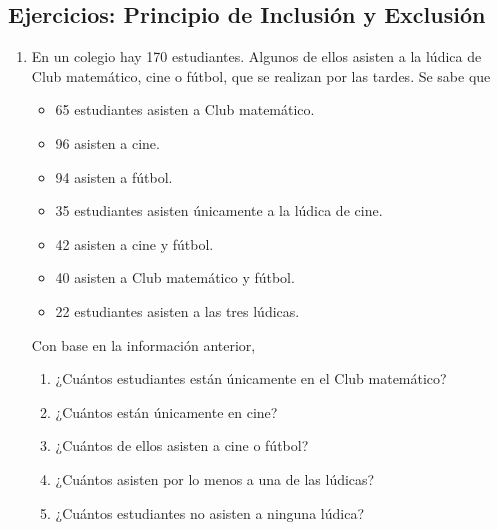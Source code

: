 \newpage
\begin{center}
	\vspace{-1cm}
	\section{ Ejercicios: Principio de Inclusión y Exclusión}
\end{center}	
\begin{enumerate}
	\item En un colegio hay 170 estudiantes. Algunos de ellos asisten a la lúdica de Club matemático,  cine o fútbol, que se realizan por las tardes. Se sabe que
	\begin{itemize}
		\item 65 estudiantes asisten a Club matemático.
		\item 96 asisten a cine.
		\item 94 asisten a fútbol.
		\item 35 estudiantes asisten únicamente a la lúdica de cine.
		\item 42 asisten a cine y fútbol.
		\item 40 asisten a Club matemático y fútbol.
		\item 22 estudiantes asisten a las tres lúdicas.
	\end{itemize}
	Con base en la información anterior,
	\begin{enumerate}
		\item ¿Cuántos estudiantes están únicamente en el Club matemático?
		\item ¿Cuántos están únicamente en cine?
		\item ¿Cuántos de ellos asisten a cine o fútbol?
		\item ¿Cuántos asisten por lo menos a una de las lúdicas?
		\item ¿Cuántos estudiantes no asisten a ninguna lúdica?
	\end{enumerate}
\end{enumerate}
\newpage
